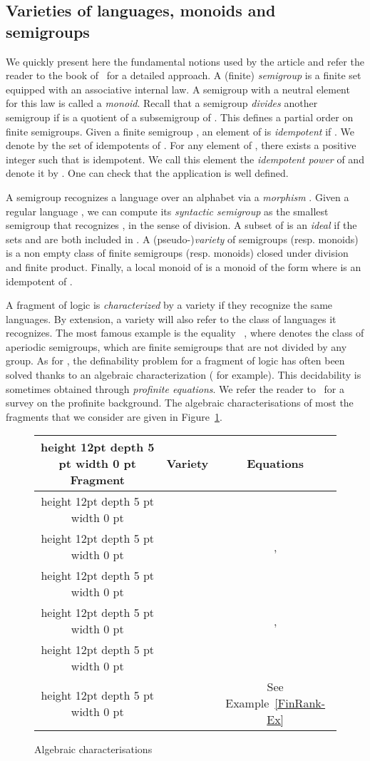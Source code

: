 \documentclass[submission,hidelink]{dmtcs-episciences}
\newcommand{\tvi}{\vrule height 12pt depth 5 pt width 0 pt}
\begin{document}
	\subsection{Varieties of languages, monoids and semigroups}
We quickly present here the fundamental notions used by the article and refer the reader to the book of~\cite{Pin97a} for a detailed approach.
A (finite) \emph{semigroup} is a finite set equipped with an associative internal law.
A semigroup with a neutral element for this law is called a \emph{monoid}.
Recall that a semigroup  \emph{divides} another semigroup  if  is a quotient of a
subsemigroup of .
This defines a partial order on finite semigroups.
Given a finite semigroup , an element  of  is \emph{idempotent} if .
We denote by  the set of idempotents of .
For any element  of , there exists a positive integer  such that  is idempotent. We call this element the \emph{idempotent power} of  and denote it by .
One can check that the application  is well defined.

A semigroup  recognizes a language  over an alphabet  via a \emph{morphism}
.
Given a regular language , we can compute its \emph{syntactic semigroup} as the smallest semigroup that recognizes , in the sense of division.
A subset  of  is an \emph{ideal} if the sets  and  are both included in .
A (pseudo-)\emph{variety} of semigroups (resp. monoids) is a non empty class of finite semigroups (resp. monoids) closed under
division and finite product.
Finally, a local monoid of  is a monoid of the form  where  is an idempotent of .

A fragment of logic is \emph{characterized} by a variety if they recognize the same languages.
By extension, a variety  will also refer to the class of languages it recognizes.
The most famous example is the equality ~\citep{MP71,Schutzenberger65}, where  denotes the class of aperiodic semigroups, which are
finite semigroups that are not divided by any group.
As for , the definability problem for a fragment of logic has often been solved thanks to an algebraic characterization (\cite{SI75,Th81,TW98} for example).
This decidability is sometimes obtained through \emph{profinite equations}.
We refer the reader to~\cite{PIN09} for a survey on the profinite background. The algebraic characterisations of most the fragments that we consider are given in Figure~\ref{Tableau:Alg}.
\begin{figure}[h]
\begin{tabular}{|c|c|c|}
\hline\tvi
Fragment & Variety & Equations \\
\hline\tvi
 &   &  \\
\hline\tvi
 &  & ,  \\
\hline\tvi
&  &  \\
\hline\tvi
 &  & ,  \\
\hline\tvi
 &  & \\
\hline\tvi
 &  & See Example~\ref{FinRank-Ex} \\
\hline


\end{tabular}
\centering
\caption{Algebraic characterisations}\label{Tableau:Alg}
\end{figure}
\end{document}

